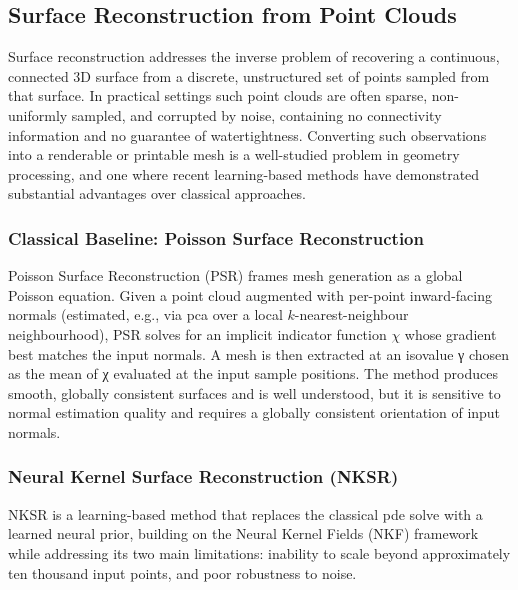 \subsection{Surface Reconstruction from Point Clouds}\label{subsec:nksr}

Surface reconstruction addresses the inverse problem of recovering a
continuous, connected 3D surface from a discrete, unstructured set of
points sampled from that surface.
In practical settings such point clouds are often sparse, non-uniformly
sampled, and corrupted by noise, containing no connectivity information
and no guarantee of watertightness.
Converting such observations into a renderable or printable mesh is a
well-studied problem in geometry processing, and one where recent
learning-based methods have demonstrated substantial advantages over
classical approaches.

\subsubsection{Classical Baseline: Poisson Surface Reconstruction}

Poisson Surface Reconstruction (PSR) \cite{kazhdan2006poisson} frames
mesh generation as a global Poisson equation.
Given a point cloud augmented with per-point inward-facing normals
(estimated, e.g., via \acrshort{pca} over a local $k$-nearest-neighbour
neighbourhood), PSR solves for an implicit indicator function $\chi$
whose gradient best matches the input normals.
A mesh is then extracted at an isovalue γ chosen as the mean of χ
evaluated at the input sample positions.
The method produces smooth, globally consistent surfaces and is well
understood, but it is sensitive to normal estimation quality and
requires a globally consistent orientation of input normals.

\subsubsection{Neural Kernel Surface Reconstruction (NKSR)}

NKSR \cite{huang2023nksr} is a learning-based method that replaces the
classical \acrshort{pde} solve with a learned neural prior, building on
the Neural Kernel Fields (NKF) framework while addressing its two main
limitations: inability to scale beyond approximately ten thousand input
points, and poor robustness to noise.

